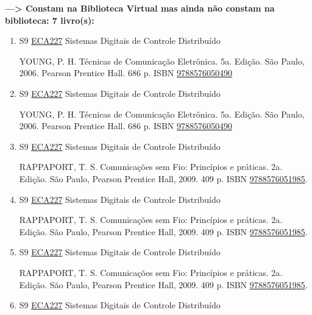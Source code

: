 \documentclass[12pt,a4paper]{book}
\begin{document}
 \textbf{---> Constam na Biblioteca Virtual mas ainda não constam na biblioteca: 7 livro(s):}\label{BIBVIRT}
\begin{enumerate}
 \item S9 \hyperref[PUD:ECA227]{ECA227} Sistemas Digitais de Controle Distribuído

  YOUNG, P.  H.  Técnicas de Comunicação Eletrônica.  5a.  Edição.  São Paulo, 2006.  Pearson Prentice Hall.  686 p.  ISBN \href{http://www.bn.br/site/pages/servicosProfissionais/agenciaISBN/isbnBusca/FbnBuscaISBNCatalogo.asp?pField=ISBN&pIntPagina=1&pISBN=76050490&nidbISBN=true&hidbISBN=true}{9788576050490}
 
 
 \item S9 \hyperref[PUD:ECA227]{ECA227} Sistemas Digitais de Controle Distribuído

  YOUNG, P.  H.  Técnicas de Comunicação Eletrônica.  5a.  Edição.  São Paulo, 2006.  Pearson Prentice Hall.  686 p.  ISBN \href{http://www.bn.br/site/pages/servicosProfissionais/agenciaISBN/isbnBusca/FbnBuscaISBNCatalogo.asp?pField=ISBN&pIntPagina=1&pISBN=76050490&nidbISBN=true&hidbISBN=true}{9788576050490}
 
 
 \item S9 \hyperref[PUD:ECA227]{ECA227} Sistemas Digitais de Controle Distribuído

  RAPPAPORT, T.  S.  Comunicações sem Fio: Princípios e práticas.  2a.  Edição.  São Paulo, Pearson Prentice Hall, 2009.  409 p.  ISBN \href{http://www.bn.br/site/pages/servicosProfissionais/agenciaISBN/isbnBusca/FbnBuscaISBNCatalogo.asp?pField=ISBN&pIntPagina=1&pISBN=76051985&nidbISBN=true&hidbISBN=true}{9788576051985}.
 \item S9 \hyperref[PUD:ECA227]{ECA227} Sistemas Digitais de Controle Distribuído

  RAPPAPORT, T.  S.  Comunicações sem Fio: Princípios e práticas.  2a.  Edição.  São Paulo, Pearson Prentice Hall, 2009.  409 p.  ISBN \href{http://www.bn.br/site/pages/servicosProfissionais/agenciaISBN/isbnBusca/FbnBuscaISBNCatalogo.asp?pField=ISBN&pIntPagina=1&pISBN=76051985&nidbISBN=true&hidbISBN=true}{9788576051985}.
 \item S9 \hyperref[PUD:ECA227]{ECA227} Sistemas Digitais de Controle Distribuído

  RAPPAPORT, T.  S.  Comunicações sem Fio: Princípios e práticas.  2a.  Edição.  São Paulo, Pearson Prentice Hall, 2009.  409 p.  ISBN \href{http://www.bn.br/site/pages/servicosProfissionais/agenciaISBN/isbnBusca/FbnBuscaISBNCatalogo.asp?pField=ISBN&pIntPagina=1&pISBN=76051985&nidbISBN=true&hidbISBN=true}{9788576051985}.
 \item S9 \hyperref[PUD:ECA227]{ECA227} Sistemas Digitais de Controle Distribuído


\end{enumerate}
\end{document}
